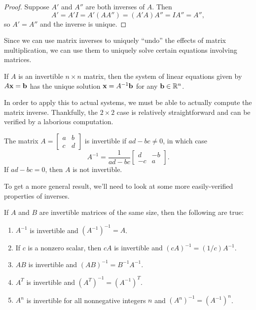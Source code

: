 \documentclass[../m073main.tex]{subfiles}
\begin{document}
\begin{proof}
	Suppose $A'$ and $A''$ are both inverses of $A$.
	Then
	\[ A' = A'I = A'(AA'') = (A'A)A'' = IA'' = A'', \]
	so $A' = A''$ and the inverse is unique.
\end{proof}

Since we can use matrix inverses to uniquely ``undo'' the effects of matrix multiplication, we can use them to uniquely solve certain equations involving matrices.

\begin{theorem}
	If $A$ is an invertible $n\times n$ matrix, then the system of linear equations given by $A\mathbf{x} = \mathbf{b}$ has the unique solution $\mathbf{x} = A^{-1}\mathbf{b}$ for any $\mathbf{b}\in\mathbb{R}^n$.
\end{theorem}

In order to apply this to actual systems, we must be able to actually compute the matrix inverse.
Thankfully, the $2 \times 2$ case is relatively straightforward and can be verified by a laborious computation.

\begin{theorem}
	The matrix $A = \begin{bmatrix} a & b \\ c & d \end{bmatrix}$ is invertible if $ad - bc \neq 0$, in which case
	\[ A^{-1} = \frac{1}{ad-bc} \begin{bmatrix} d & -b \\ -c & a \end{bmatrix}. \]
	If $ad-bc = 0$, then $A$ is not invertible.
\end{theorem}

To get a more general result, we'll need to look at some more easily-verified properties of inverses.

\pagebreak

\begin{theorem}
	If $A$ and $B$ are invertible matrices of the same size, then the following are true:
	\begin{enumerate}[label=(\alph*)]
		\item $A^{-1}$ is invertible and $(A^{-1})^{-1} = A$.
		\item If $c$ is a nonzero scalar, then $cA$ is invertible and $(cA)^{-1} = (1 / c) A^{-1}$.
		\item $AB$ is invertible and $(AB)^{-1} = B^{-1}A^{-1}$.
		\item $A^T$ is invertible and $(A^T)^{-1} = (A^{-1})^T$.
		\item $A^n$ is invertible for all nonnegative integers $n$ and $(A^n)^{-1} = (A^{-1})^n$.
	\end{enumerate}
\end{theorem}
\end{document}
